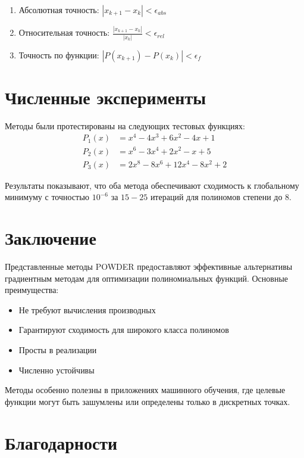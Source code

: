 \documentclass[12pt,a4paper]{article}
\begin{document}
\begin{enumerate}
    \item Абсолютная точность: $|x_{k+1} - x_k| < \epsilon_{abs}$
    \item Относительная точность: $\frac{|x_{k+1} - x_k|}{|x_k|} < \epsilon_{rel}$
    \item Точность по функции: $|P(x_{k+1}) - P(x_k)| < \epsilon_f$
\end{enumerate}

\section{Численные эксперименты}

Методы были протестированы на следующих тестовых функциях:
\begin{align}
    P_1(x) &= x^4 - 4x^3 + 6x^2 - 4x + 1 \\
    P_2(x) &= x^6 - 3x^4 + 2x^2 - x + 5 \\
    P_3(x) &= 2x^8 - 8x^6 + 12x^4 - 8x^2 + 2
\end{align}

Результаты показывают, что оба метода обеспечивают сходимость к глобальному минимуму с точностью $10^{-6}$ за $15-25$ итераций для полиномов степени до 8.

\section{Заключение}

Представленные методы POWDER предоставляют эффективные альтернативы градиентным методам для оптимизации полиномиальных функций. Основные преимущества:

\begin{itemize}
    \item Не требуют вычисления производных
    \item Гарантируют сходимость для широкого класса полиномов
    \item Просты в реализации
    \item Численно устойчивы
\end{itemize}

Методы особенно полезны в приложениях машинного обучения, где целевые функции могут быть зашумлены или определены только в дискретных точках.

\section*{Благодарности}
\end{document}
